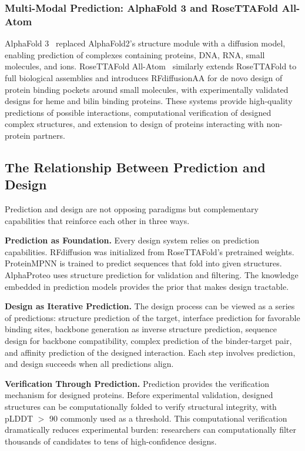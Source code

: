 \subsubsection{Multi-Modal Prediction: AlphaFold 3 and RoseTTAFold All-Atom}

AlphaFold 3~\citep{abramson2024alphafold3} replaced AlphaFold2's structure module with a diffusion model, enabling prediction of complexes containing proteins, DNA, RNA, small molecules, and ions. RoseTTAFold All-Atom~\citep{krishna2024rfaa} similarly extends RoseTTAFold to full biological assemblies and introduces RFdiffusionAA for de novo design of protein binding pockets around small molecules, with experimentally validated designs for heme and bilin binding proteins. These systems provide high-quality predictions of possible interactions, computational verification of designed complex structures, and extension to design of proteins interacting with non-protein partners.

\subsection{The Relationship Between Prediction and Design}
\label{subsec:relationship}

Prediction and design are not opposing paradigms but complementary capabilities that reinforce each other in three ways.

\textbf{Prediction as Foundation.} Every design system relies on prediction capabilities. RFdiffusion was initialized from RoseTTAFold's pretrained weights. ProteinMPNN is trained to predict sequences that fold into given structures. AlphaProteo uses structure prediction for validation and filtering. The knowledge embedded in prediction models provides the prior that makes design tractable.

\textbf{Design as Iterative Prediction.} The design process can be viewed as a series of predictions: structure prediction of the target, interface prediction for favorable binding sites, backbone generation as inverse structure prediction, sequence design for backbone compatibility, complex prediction of the binder-target pair, and affinity prediction of the designed interaction. Each step involves prediction, and design succeeds when all predictions align.

\textbf{Verification Through Prediction.} Prediction provides the verification mechanism for designed proteins. Before experimental validation, designed structures can be computationally folded to verify structural integrity, with pLDDT $>$ 90 commonly used as a threshold. This computational verification dramatically reduces experimental burden: researchers can computationally filter thousands of candidates to tens of high-confidence designs.

